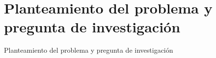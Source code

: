 \documentclass{standalone}
\begin{document}
	\section*{Planteamiento del problema y pregunta de investigaci\'on}
	Planteamiento del problema y pregunta de investigaci\'on
\end{document}
